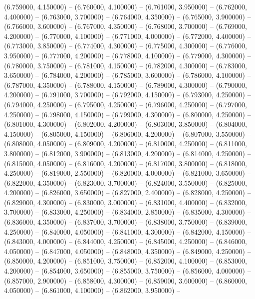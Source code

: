 (6.759000, 4.150000) -- 
(6.760000, 4.100000) -- 
(6.761000, 3.950000) -- 
(6.762000, 4.400000) -- 
(6.763000, 3.700000) -- 
(6.764000, 4.350000) -- 
(6.765000, 3.900000) -- 
(6.766000, 3.600000) -- 
(6.767000, 4.350000) -- 
(6.768000, 3.700000) -- 
(6.769000, 4.200000) -- 
(6.770000, 4.100000) -- 
(6.771000, 4.000000) -- 
(6.772000, 4.400000) -- 
(6.773000, 3.850000) -- 
(6.774000, 4.300000) -- 
(6.775000, 4.300000) -- 
(6.776000, 3.950000) -- 
(6.777000, 4.200000) -- 
(6.778000, 4.100000) -- 
(6.779000, 4.300000) -- 
(6.780000, 3.750000) -- 
(6.781000, 4.150000) -- 
(6.782000, 4.300000) -- 
(6.783000, 3.650000) -- 
(6.784000, 4.200000) -- 
(6.785000, 3.600000) -- 
(6.786000, 4.100000) -- 
(6.787000, 4.350000) -- 
(6.788000, 4.150000) -- 
(6.789000, 4.300000) -- 
(6.790000, 4.200000) -- 
(6.791000, 3.700000) -- 
(6.792000, 4.150000) -- 
(6.793000, 4.250000) -- 
(6.794000, 4.250000) -- 
(6.795000, 4.250000) -- 
(6.796000, 4.250000) -- 
(6.797000, 4.250000) -- 
(6.798000, 4.150000) -- 
(6.799000, 4.300000) -- 
(6.800000, 4.250000) -- 
(6.801000, 4.300000) -- 
(6.802000, 4.200000) -- 
(6.803000, 3.850000) -- 
(6.804000, 4.150000) -- 
(6.805000, 4.150000) -- 
(6.806000, 4.200000) -- 
(6.807000, 3.550000) -- 
(6.808000, 4.050000) -- 
(6.809000, 4.200000) -- 
(6.810000, 4.250000) -- 
(6.811000, 3.800000) -- 
(6.812000, 3.900000) -- 
(6.813000, 4.200000) -- 
(6.814000, 4.250000) -- 
(6.815000, 4.050000) -- 
(6.816000, 4.200000) -- 
(6.817000, 3.800000) -- 
(6.818000, 4.250000) -- 
(6.819000, 2.550000) -- 
(6.820000, 4.000000) -- 
(6.821000, 3.650000) -- 
(6.822000, 4.350000) -- 
(6.823000, 3.700000) -- 
(6.824000, 3.550000) -- 
(6.825000, 4.200000) -- 
(6.826000, 3.650000) -- 
(6.827000, 2.400000) -- 
(6.828000, 4.250000) -- 
(6.829000, 4.300000) -- 
(6.830000, 3.000000) -- 
(6.831000, 4.400000) -- 
(6.832000, 3.700000) -- 
(6.833000, 4.250000) -- 
(6.834000, 2.850000) -- 
(6.835000, 4.300000) -- 
(6.836000, 4.350000) -- 
(6.837000, 3.700000) -- 
(6.838000, 3.750000) -- 
(6.839000, 4.250000) -- 
(6.840000, 4.050000) -- 
(6.841000, 4.300000) -- 
(6.842000, 4.150000) -- 
(6.843000, 4.000000) -- 
(6.844000, 4.250000) -- 
(6.845000, 4.250000) -- 
(6.846000, 4.050000) -- 
(6.847000, 4.050000) -- 
(6.848000, 4.350000) -- 
(6.849000, 4.250000) -- 
(6.850000, 4.200000) -- 
(6.851000, 3.750000) -- 
(6.852000, 4.100000) -- 
(6.853000, 4.200000) -- 
(6.854000, 3.650000) -- 
(6.855000, 3.750000) -- 
(6.856000, 4.000000) -- 
(6.857000, 2.900000) -- 
(6.858000, 4.300000) -- 
(6.859000, 3.600000) -- 
(6.860000, 4.050000) -- 
(6.861000, 4.100000) -- 
(6.862000, 3.950000) -- 
